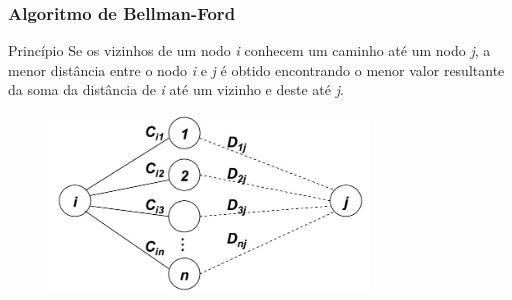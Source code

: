 \documentclass{beamer}
\begin{document}
\begin{frame}
\frametitle{Algoritmo de Bellman-Ford}
\begin{block}{Princípio}
Se os vizinhos de um nodo \emph{i} conhecem um caminho até um nodo \emph{j}, a menor distância
entre o nodo \emph{i} e \emph{j} é obtido encontrando o menor valor resultante
da soma da distância de \emph{i} até um vizinho e deste até \emph{j}.
\end{block}
\begin{figure}[htp]
\begin{center}
  \includegraphics[width=85mm]{Imagens/BellmanFord.jpeg}
  \label{bellman_ford}
\end{center}
\end{figure}
\end{frame}
\end{document}

